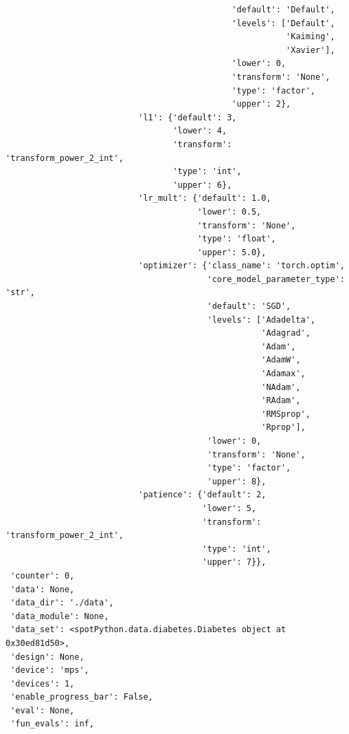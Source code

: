 \documentclass[
  letterpaper,
  DIV=11,
  numbers=noendperiod]{scrreprt}
\begin{document}
\begin{verbatim}
                                              'default': 'Default',
                                              'levels': ['Default',
                                                         'Kaiming',
                                                         'Xavier'],
                                              'lower': 0,
                                              'transform': 'None',
                                              'type': 'factor',
                                              'upper': 2},
                           'l1': {'default': 3,
                                  'lower': 4,
                                  'transform': 'transform_power_2_int',
                                  'type': 'int',
                                  'upper': 6},
                           'lr_mult': {'default': 1.0,
                                       'lower': 0.5,
                                       'transform': 'None',
                                       'type': 'float',
                                       'upper': 5.0},
                           'optimizer': {'class_name': 'torch.optim',
                                         'core_model_parameter_type': 'str',
                                         'default': 'SGD',
                                         'levels': ['Adadelta',
                                                    'Adagrad',
                                                    'Adam',
                                                    'AdamW',
                                                    'Adamax',
                                                    'NAdam',
                                                    'RAdam',
                                                    'RMSprop',
                                                    'Rprop'],
                                         'lower': 0,
                                         'transform': 'None',
                                         'type': 'factor',
                                         'upper': 8},
                           'patience': {'default': 2,
                                        'lower': 5,
                                        'transform': 'transform_power_2_int',
                                        'type': 'int',
                                        'upper': 7}},
 'counter': 0,
 'data': None,
 'data_dir': './data',
 'data_module': None,
 'data_set': <spotPython.data.diabetes.Diabetes object at 0x30ed81d50>,
 'design': None,
 'device': 'mps',
 'devices': 1,
 'enable_progress_bar': False,
 'eval': None,
 'fun_evals': inf,

\end{verbatim}
\end{document}
